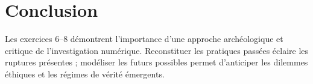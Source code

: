 \documentclass[12pt,a4paper]{article}
\begin{document}
\section{Conclusion}
Les exercices 6–8 démontrent l’importance d’une approche archéologique et critique de l’investigation numérique.  
Reconstituer les pratiques passées éclaire les ruptures présentes ; modéliser les futurs possibles permet d’anticiper les dilemmes éthiques et les régimes de vérité émergents.
\end{document}

